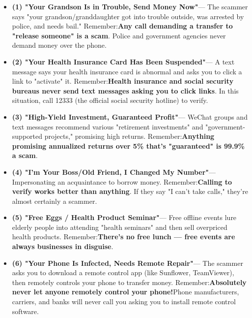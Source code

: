 \begin{itemize}
  \item \textbf{(1) "Your Grandson Is in Trouble, Send Money Now"}— The scammer says "your grandson/granddaughter got into trouble outside, was arrested by police, and needs bail." Remember:\textbf{Any call demanding a transfer to "release someone" is a scam}. Police and government agencies never demand money over the phone.
  \item \textbf{(2) "Your Health Insurance Card Has Been Suspended"}— A text message says your health insurance card is abnormal and asks you to click a link to "activate" it. Remember:\textbf{Health insurance and social security bureaus never send text messages asking you to click links}. In this situation, call 12333 (the official social security hotline) to verify.
  \item \textbf{(3) "High-Yield Investment, Guaranteed Profit"}— WeChat groups and text messages recommend various "retirement investments" and "government-supported projects," promising high returns. Remember:\textbf{Anything promising annualized returns over 5\% that's "guaranteed" is 99.9\% a scam}.
  \item \textbf{(4) "I'm Your Boss/Old Friend, I Changed My Number"}— Impersonating an acquaintance to borrow money. Remember:\textbf{Calling to verify works better than anything}. If they say "I can't take calls," they're almost certainly a scammer.
  \item \textbf{(5) "Free Eggs / Health Product Seminar"}— Free offline events lure elderly people into attending "health seminars" and then sell overpriced health products. Remember:\textbf{There's no free lunch — free events are always businesses in disguise}.
  \item \textbf{(6) "Your Phone Is Infected, Needs Remote Repair"}— The scammer asks you to download a remote control app (like Sunflower, TeamViewer), then remotely controls your phone to transfer money. Remember:\textbf{Absolutely never let anyone remotely control your phone!}Phone manufacturers, carriers, and banks will never call you asking you to install remote control software.
\end{itemize}


